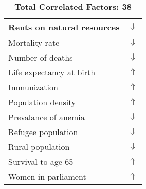 \documentclass[12pt,notitlepage,oneside]{report}
\begin{document}
\begin{table}[!htb]
\begin{tabular}{|l|l|}
Rents on natural resources & $\Downarrow$\\ \hline
Mortality rate & $\Downarrow$\\ \hline
Number of deaths & $\Downarrow$\\ \hline
Life expectancy at birth & $\Uparrow$\\ \hline
Immunization & $\Uparrow$\\ \hline
Population density & $\Uparrow$\\ \hline
Prevalance of anemia & $\Downarrow$\\ \hline
Refugee population & $\Downarrow$\\ \hline
Rural population & $\Downarrow$\\ \hline
Survival to age 65 & $\Uparrow$\\ \hline
Women in parliament & $\Uparrow$\\ \hline
\end{tabular}
\caption*{\textbf{Total Correlated Factors: 38}}
\end{table}
\clearpage
\end{document}
